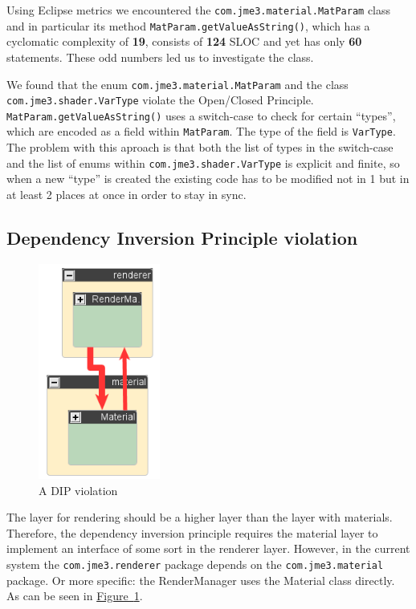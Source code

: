 \documentclass[a4paper, 10pt]{article}
\begin{document}
Using Eclipse metrics we encountered the
\verb|com.jme3.material.MatParam| class and in particular its method
\verb|MatParam.getValueAsString()|, which has a cyclomatic complexity
of \textbf{19}, consists of \textbf{124} SLOC and yet has only
\textbf{60} statements. These odd numbers led us to investigate the
class.

We found that the enum \verb|com.jme3.material.MatParam| and the class\\
\verb|com.jme3.shader.VarType| violate the Open/Closed Principle.\\
\verb|MatParam.getValueAsString()| uses a switch-case to check for
certain ``types'', which are encoded as a field within
\verb|MatParam|. The type of the field is \verb|VarType|. The problem
with this aproach is that both the list of types in the switch-case
and the list of enums within \verb|com.jme3.shader.VarType| is
explicit and finite, so when a new ``type'' is created the existing
code has to be modified not in 1 but in at least 2 places at once in
order to stay in sync.



\subsection{Dependency Inversion Principle violation}
\label{sec:dip_violation}
\begin{figure}
\includegraphics[width=40mm]{figures/dip-violation.png}
\vspace{-15pt}
\caption{A DIP violation}
\label{fig:dip-violation}
\vspace{-60pt}
\end{figure}

The layer for rendering should be a higher layer than the
layer with materials.
Therefore, the dependency inversion principle requires
the material layer to implement an interface of some sort
in the renderer layer.
However, in the current system the \verb|com.jme3.renderer| package 
depends on the \verb|com.jme3.material| package.
Or more specific: the RenderManager uses the Material class directly.
As can be seen in 
\hyperref[fig:dip-violation]{Figure~\ref*{fig:dip-violation}}.
\end{document}
